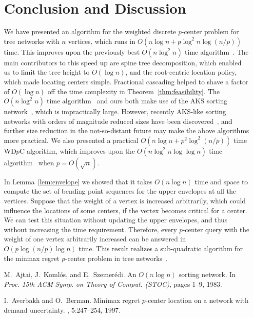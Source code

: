 \documentclass{llncs}
\begin{document}
{\section{Conclusion and Discussion}\label{sec:conclusion}
We have presented an algorithm for the weighted discrete $p$-center problem
for tree networks with $n$ vertices,
which runs in $O(n \log n+p \log^2 n \log (n/p))$ time.
This improves upon the previously best $O(n\log^2 n)$ time algorithm~\cite{cole1987}.
The main contributors to this speed up are spine tree decomposition,
which enabled us to limit the tree height to $O(\log n)$,
and the root-centric location policy,
which made locating centers simple.
Fractional cascading helped to shave a factor of $O(\log n)$
off the time complexity in Theorem~\ref{thm:feasibility}.
The $O(n\log^2 n)$ time algorithm~\cite{cole1987} and ours both
make use of the AKS sorting network~\cite{ajtai1983},
which is impractically large. 
However, recently AKS-like sorting networks with orders of magnitude reduced sizes
have been discovered~\cite{goodrich2014,seiferas2009},
and further size reduction in the not-so-distant future may make the above algorithms more practical.
We also presented a practical $O(n\log n + p^2\log^2(n/p))$ time WD$p$C algorithm,
which improves upon the $O(n\log^2 n\log\log n)$ time algorithm~\cite{megiddo1983c}
when $p=O(\sqrt{n})$.

In Lemma~\ref{lem:envelope} we showed that it takes $O(n\log n)$ time and space
to compute the set of bending point sequences for the upper envelopes at all the vertices.
Suppose that the weight of a vertex is increased arbitrarily,
which could influence the locations of some centers,
if the vertex becomes critical for a center.
We can test this situation without updating the upper envelopes,
and thus without increasing the time requirement.
Therefore, every $p$-center query with the weight of one vertex
arbitrarily increased can be answered in $O(p\log (n/p)\log n)$ time.
This result realizes a sub-quadratic algorithm for the minmax regret $p$-center problem
in tree networks~\cite{averbakh1997}.
\begin{thebibliography}{10}

M.~Ajtai, J.~Koml\'os, and E.~Szemer\'edi.
\newblock An ${O}(n \log n)$ sorting network.
\newblock In {\em Proc. 15th ACM Symp. on Theory of Comput. (STOC)}, pages
  1--9, 1983.

I.~Averbakh and O.~Berman.
\newblock Minimax regret $p$-center location on a network with demand
  uncertainty.
, 5:247--254, 1997.


\end{thebibliography}}
\end{document}
